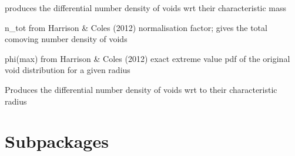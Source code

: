 \documentclass[letterpaper,10pt,english]{sphinxmanual}
\begin{document}

\begin{fulllineitems}
\label{PyCosmo:PyCosmo.void_distribution.void_mass_dist}
produces the differential number density of voids
wrt their characteristic mass

\end{fulllineitems}


\begin{fulllineitems}
\label{PyCosmo:PyCosmo.void_distribution.void_norm}
n\_tot from Harrison \& Coles (2012)
normalisation factor; gives the 
total comoving number density of voids

\end{fulllineitems}


\begin{fulllineitems}
\label{PyCosmo:PyCosmo.void_distribution.void_pdf}
phi(max) from Harrison \& Coles (2012)
exact extreme value pdf of the original
void distribution for a given radius

\end{fulllineitems}


\begin{fulllineitems}
\label{PyCosmo:PyCosmo.void_distribution.void_radii_dist}
Produces the differential number density of voids 
wrt to their characteristic radius

\end{fulllineitems}



\section{Subpackages}
\label{PyCosmo:subpackages}
\end{document}
